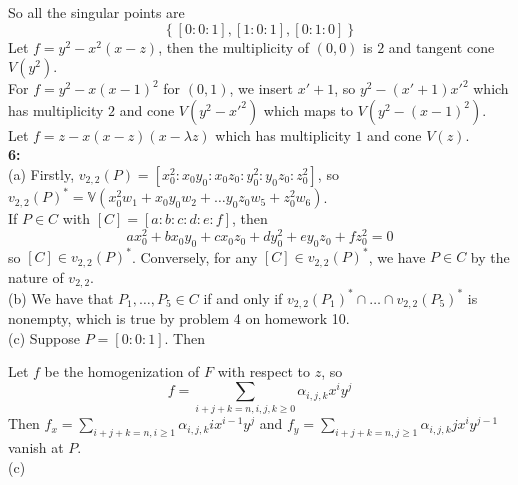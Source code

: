 \documentclass[a4paper]{article}
\begin{document}
So all the singular points are 
\[
\left\{ \left[ 0 : 0 : 1 \right] ,
\left[ 1 : 0 : 1 \right] ,
\left[ 0 : 1 : 0 \right]  \right\} 
\] 
Let $f = y^2 - x^2 (x-z)$, then the multiplicity of $(0,0)$ is
$2$ and tangent cone $V(y^2)$.\\
For $f = y^2 - x (x-1)^2$ for $(0,1)$, we insert  $x'+1$, so
 $y^2 - (x'+1) x'^2$ which has multiplicity $2$ and
 cone $V\left( y^2 - x'^2 \right) $ which maps to
 $V \left( y^2 - (x-1)^2 \right) $.\\
 \linebreak
 Let $f = z - x (x-z) (x- \lambda z)$ which has multiplicity $1$ and
 cone $V(z)$.\\
 \linebreak
\textbf{6:}\\
(a) Firstly, $v_{2,2}(P) =
\left[ x_0^2 : x_0y_0 : x_0 z_0 : y_0^2 : y_0 z_0 : z_0^2 \right] $, so
$v_{2,2}(P)^{*} = \mathbb{V}\left( x_0^2 w_1+ x_0 y_0 w_2+ \ldots y_0z_0 w_5 +
 z_0^2 w_6 \right) $.\\
 \linebreak
 If $P \in C$ with $\left[ C \right] =
 \left[ a : b : c : d : e : f \right] $, then
\[
 a x_0^2 + b x_0 y_0 + c x_0 z_0 + dy_0^2 + ey_0 z_0 +
f z_0^2 = 0
\]
so $\left[ C \right] \in v_{2,2}(P)^{*}$. Conversely, for any
$\left[ C \right] \in v_{2,2}(P)^{*}$, we have
$P \in C$ by the nature of $v_{2,2}$.\\
\linebreak
(b) We have that $P_1, \ldots, P_5 \in C$ if and only if
$v_{2,2}(P_1)^{*} \cap \ldots \cap v_{2,2}(P_5)^{*}$ is nonempty, which is true
by problem 4 on homework 10.\\
\linebreak
(c) Suppose $P = \left[ 0:0:1 \right] $. Then











\newpage
Let $f$ be the homogenization of
$F$ with respect to $z$, so
 \[
f = \sum_{i+j+k = n, i,j,k\ge 0} \alpha_{i,j,k}x^{i}y^{j}
\] 
Then $f_x = \sum_{i+j+k =n, i\ge 1} \alpha_{i,j,k} i x^{i-1}y^{j}$ and
$f_y = \sum_{i+j+k = n, j\ge 1} \alpha_{i,j,k}j x^{i}y^{j-1}$ vanish at
$P$.\\
\linebreak
(c) 
 
\end{document}
